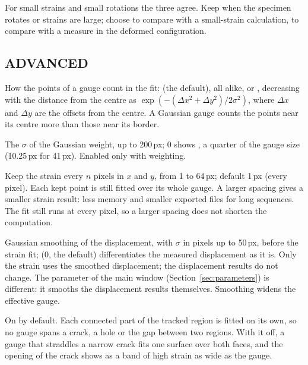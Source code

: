 For small strains and small rotations the three agree. Keep  when the specimen
rotates or strains are large; choose  to compare with a small-strain
calculation,  to compare with a measure in the deformed configuration.

\subsection{ADVANCED}

\begin{description}[leftmargin=1.2cm,style=nextline]
  \item[Weighting]
    How the points of a gauge count in the fit:  (the default), all alike, or
    , decreasing with the distance from the centre as
    $\exp\!\left(-(\Delta x^2 + \Delta y^2)/2\sigma^2\right)$, where $\Delta x$ and $\Delta y$ are
    the offsets from the centre. A Gaussian gauge counts the points near its centre more than
    those near its border.
  \item[Gaussian $\sigma$]
    The $\sigma$ of the Gaussian weight, up to 200\,px; 0 shows , a quarter
    of the gauge size (10.25\,px for 41\,px). Enabled only with  weighting.
  \item[Output spacing]
    Keep the strain every $n$ pixels in $x$ and $y$, from 1 to 64\,px; default 1\,px (every
    pixel). Each kept point is still fitted over its whole gauge. A larger spacing gives a
    smaller strain result: less memory and smaller exported files for long sequences. The fit
    still runs at every pixel, so a larger spacing does not shorten the computation.
  \item[Pre-fit smoothing]
    Gaussian smoothing of the displacement, with $\sigma$ in pixels up to 50\,px, before the
    strain fit;  (0, the default) differentiates the measured displacement as it is.
    Only the strain uses the smoothed displacement; the displacement results do not change. The
     parameter of the main window (Section~\ref{sec:parameters}) is different: it
    smooths the displacement results themselves. Smoothing widens the effective gauge.
  \item[Never fit across cracks or holes]
    On by default. Each connected part of the tracked region is fitted on its own, so no gauge
    spans a crack, a hole or the gap between two regions. With it off, a gauge that straddles a
    narrow crack fits one surface over both faces, and the opening of the crack shows as a band
    of high strain as wide as the gauge.
\end{description}

